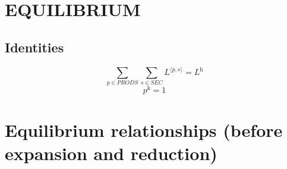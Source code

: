 \section{EQUILIBRIUM}

\subsection{Identities}

\begin{equation}
\sum_{p\in {P\!R\!O\!D\!S}} \sum_{s\in {S\!E\!C}} {L}^{\langle p,s\rangle} = L^{\mathrm{h}}
\end{equation}
\begin{equation}
p^{\mathrm{k}} = 1
\end{equation}




\section{Equilibrium relationships (before expansion and reduction)}

